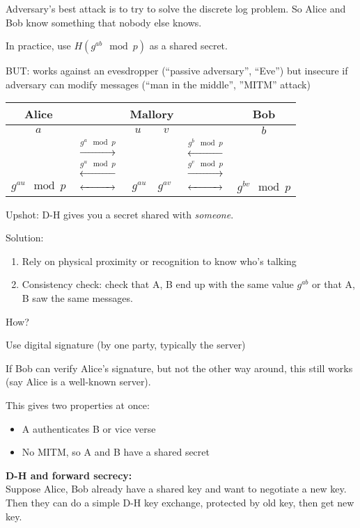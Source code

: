 Adversary's best attack is to try to solve the discrete log problem. So Alice
and Bob know something that nobody else knows.

In practice, use $H(g^{ab} \mod p)$ as a shared secret.

BUT: works against an evesdropper (``passive adversary'', ``Eve'') but insecure
if adversary can modify messages (``man in the middle'', ''MITM'' attack)

\begin{table}[h!]
\centering
\begin{tabular}{ccccc}
Alice & & Mallory & & Bob\\
\hline
$a$ & & $u \qquad v$ & & $b$\\
& $\xrightarrow{g^a \mod p}$ & & $\xleftarrow{g^b \mod p}$ &\\
& $\xleftarrow{g^u \mod p}$ & & $\xrightarrow{g^v \mod p}$ &\\
$g^{au} \mod p$ & $\xleftrightarrow{\qquad\quad}$ & $g^{au} \quad g^{av}$ & $\xleftrightarrow{\qquad\quad}$ & $g^{bv} \mod p$
\end{tabular}
\end{table}

Upshot: D-H gives you a secret shared with \emph{someone}.

Solution:
\begin{enumerate}
    \item Rely on physical proximity or recognition to know who's talking
    \item Consistency check: check that A, B end up with the same value $g^{ab}$
        or that A, B saw the same messages.
\end{enumerate}
How?

Use digital signature (by one party, typically the server)

If Bob can verify Alice's signature, but not the other way around, this still
works (say Alice is a well-known server).

This gives two properties at once:
\begin{itemize}
    \item A authenticates B or vice verse
    \item No MITM, so A and B have a shared secret
\end{itemize}

{\bf D-H and forward secrecy:}\\
Suppose Alice, Bob already have a shared key and want to negotiate a new key.
Then they can do a simple D-H key exchange, protected by old key, then get new
key.

